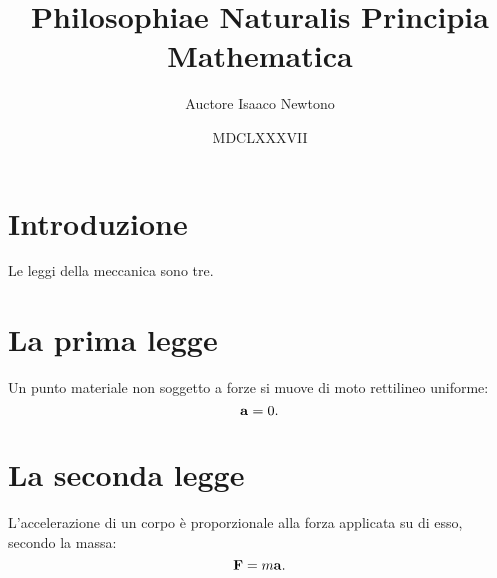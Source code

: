 \documentclass{article}
\title{Philosophiae Naturalis Principia Mathematica}
\author{Auctore Isaaco Newtono}
\date{MDCLXXXVII}
\begin{document}
\maketitle

\section{Introduzione}
Le leggi della meccanica sono tre.

\section{La prima legge}
Un punto materiale non soggetto a forze si muove di moto rettilineo uniforme:
\begin{equation}
	\vb a = 0.
\end{equation}

\section{La seconda legge}
L'accelerazione di un corpo \`e proporzionale alla forza applicata su di esso, secondo la massa:
\begin{equation}
	\vb F = m \vb a.
\end{equation}
\end{document}
